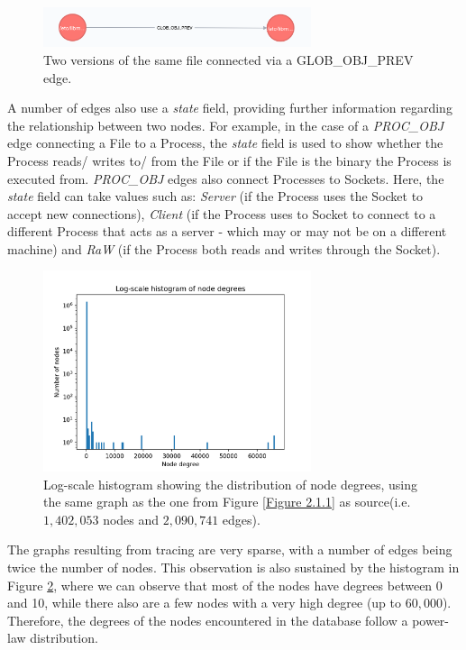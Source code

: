 	\begin{figure}[H]
		\centering

		\includegraphics[width=0.7\textwidth]{graphics/GLOB_OBJ_PREV}
		\caption{
			Two versions of the same file connected via a GLOB\_OBJ\_PREV edge.
		}
		\label{Figure 2.1.2}
	\end{figure}
	A number of edges also use a \textit{state} field, providing further information regarding the relationship between two nodes. For example, in the case of a \textit{PROC\_OBJ} edge connecting a File to a Process, the \textit{state} field is used to show whether the Process reads/ writes to/ from the File or if the File is the binary the Process is executed from. \textit{PROC\_OBJ} edges also connect Processes to Sockets. Here, the \textit{state} field can take values such as: \textit{Server} (if the Process uses the Socket to accept new connections), \textit{Client} (if the Process uses to Socket to connect to a different Process that acts as a server - which may or may not be on a different machine)  and \textit{RaW} (if the Process both reads and writes through the Socket).
	\begin{figure}[H]
		\centering
		
		\includegraphics[width=0.7\textwidth]{graphics/node_degree_hist}
		\caption[Log-scale distribution of node degrees]{
			Log-scale histogram showing the distribution of node degrees, using the same graph as the one from Figure \ref{Figure 2.1.1} as source(i.e. $1,402,053$ nodes and $2,090,741$ edges).
		}
		\label{Figure 2.1.3}
	\end{figure}
	 
	 The graphs resulting from tracing are very sparse, with a number of edges being twice the number of nodes. This observation is also sustained by the histogram in Figure \ref{Figure 2.1.3}, where we can observe that most of the nodes have degrees between 0 and 10, while there also are a few nodes with a very high degree (up to $60, 000$). Therefore, the degrees of the nodes encountered in the database follow a power-law distribution\cite{Clauset:2009:PDE:1655787.1655789}.
	 
